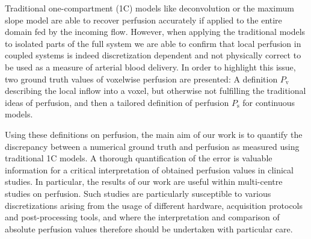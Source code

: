 \documentclass[final,5p,times,twocolumn]{elsarticle}
\begin{document}
Traditional one-compartment (1C) models like deconvolution or the maximum slope model are able to recover perfusion accurately if applied to the entire domain fed by the incoming flow. However, when applying the traditional models to isolated parts of the full system we are able to confirm that local perfusion in coupled systems is indeed discretization dependent and not physically correct to be used as a measure of arterial blood delivery. In order to highlight this issue, two ground truth values of voxelwise perfusion are presented: A definition $P_{\mathrm{v}}$ describing the local inflow into a voxel, but otherwise not fulfilling the traditional ideas of perfusion, and then a tailored definition of perfusion $P_{\mathrm{s}}$ for continuous models. 
	
Using these definitions on perfusion, the main aim of our work is to quantify the discrepancy between a numerical ground truth and perfusion as measured using traditional 1C models. A thorough quantification of the error is valuable information for a critical interpretation of obtained perfusion values in clinical studies. In particular, the results of our work are useful within multi-centre studies on perfusion. Such studies are particularly susceptible to various discretizations arising from the usage of different hardware, acquisition protocols and post-processing tools, and where the interpretation and comparison of absolute perfusion values therefore should be undertaken with particular care.
	
		
\end{document}
